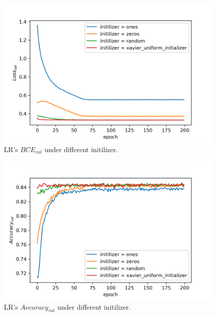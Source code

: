 \documentclass[journal, a4paper]{IEEEtran}
\begin{document}
\begin{figure}[!hbt]
	\begin{center}
		\includegraphics[width=\columnwidth]{lr_init_val_loss}
		\caption{LR's $BCE_{val}$ under different initilizer.}
		\label{fig:lr_init_val_loss}
	\end{center}
\end{figure} \par

\begin{figure}[!hbt]
	\begin{center}
		\includegraphics[width=\columnwidth]{lr_init_val_acc}
		\caption{LR's $Accuracy_{val}$ under different initilizer.}
		\label{fig:lr_init_val_acc}
	\end{center}
\end{figure} \par
\end{document}
